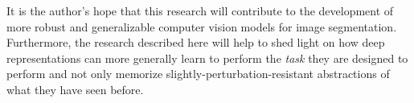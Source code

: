 \documentclass[10pt,twocolumn,letterpaper]{article}
\begin{document}
It is the author's hope that this research will contribute to the development of more robust and generalizable computer vision models for image segmentation. Furthermore, the research described here will help to shed light on how deep representations can more
generally learn to perform the \textit{task} they are designed to perform and not only memorize slightly-perturbation-resistant abstractions of what they have seen before.


{\small
%


}
\end{document}
